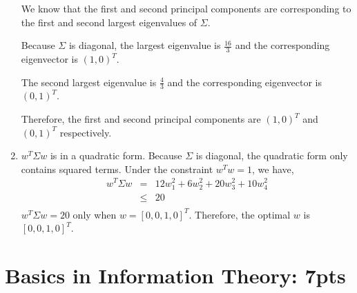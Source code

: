 \documentclass[12pt]{article}
\begin{document}
\begin{enumerate}
We know that the first and second principal components are corresponding to the first and second largest eigenvalues of $\Sigma$. 

Because $\Sigma$ is diagonal, the largest eigenvalue is $\frac{16}{3}$ and the corresponding eigenvector is $(1, 0)^T$. 

The second largest eigenvalue is $\frac{4}{3}$ and the corresponding eigenvector is $(0, 1)^T$.

Therefore, the first and second principal components are $(1, 0)^T$ and $(0, 1)^T$ respectively.

\item $w^T \Sigma w$ is in a quadratic form. Because $\Sigma$ is diagonal, the quadratic form only contains squared terms.
Under the constraint $w^T w = 1$, we have,
\begin{eqnarray}
    w^T \Sigma w &=& 12 w_1^2 + 6 w_2^2 + 20 w_3^2 + 10 w_4^2 \nonumber\\
                &\le& 20 \nonumber\\
\end{eqnarray}
$w^T \Sigma w = 20$ only when $w = [0, 0, 1, 0]^T$. Therefore, the optimal $w$ is $[0, 0, 1, 0]^T$.

\end{enumerate}
    
\section{Basics in Information Theory: 7pts}
\end{document}

